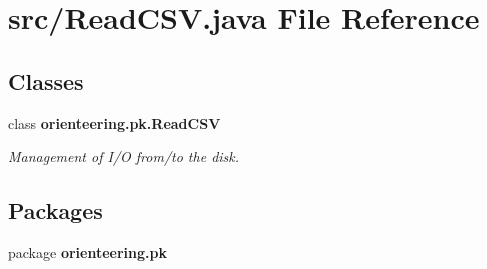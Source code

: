 \section{src/\+Read\+C\+SV.java File Reference}
\label{ReadCSV_8java}
\subsection*{Classes}
\begin{DoxyCompactItemize}
\item 
class \textbf{ orienteering.\+pk.\+Read\+C\+SV}
\begin{DoxyCompactList}\small\item\em Management of I/O from/to the disk. \end{DoxyCompactList}\end{DoxyCompactItemize}
\subsection*{Packages}
\begin{DoxyCompactItemize}
\item 
package \textbf{ orienteering.\+pk}
\end{DoxyCompactItemize}
